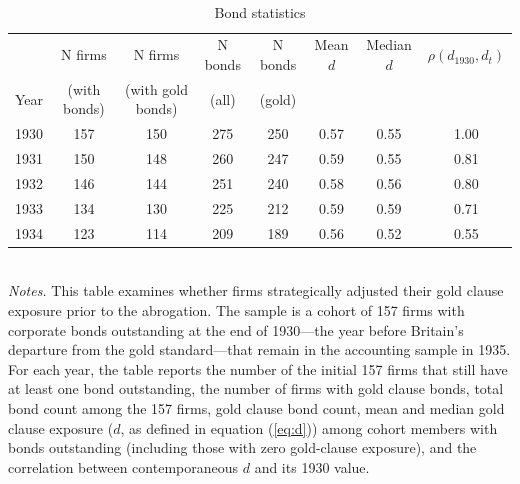 \begin{table}[p]
    \centering
    \caption{\\ Bond statistics}
    \scriptsize
    \label{tab:bond_stats}
    
    \begin{threeparttable}
        \begin{tabular}{lccccccc}
            \toprule
                 & N firms & N firms & N bonds & N bonds & Mean $d$ & Median $d$ & $\rho(d_{1930}, d_t)$ \\
            Year & (with bonds) & (with gold bonds) & (all) & (gold) & & & \\
            \midrule
            1930 & 157 & 150 & 275 & 250 & 0.57 & 0.55 & 1.00 \\
            1931 & 150 & 148 & 260 & 247 & 0.59 & 0.55 & 0.81 \\
            1932 & 146 & 144 & 251 & 240 & 0.58 & 0.56 & 0.80 \\
            1933 & 134 & 130 & 225 & 212 & 0.59 & 0.59 & 0.71 \\
            1934 & 123 & 114 & 209 & 189 & 0.56 & 0.52 & 0.55 \\
            \bottomrule
        \end{tabular}
    \end{threeparttable}\\
    
    \vspace*{3mm} \justifying \noindent
    \scriptsize{\textit{Notes.} This table examines whether firms strategically adjusted their gold clause exposure prior to the abrogation. The sample is a cohort of 157 firms with corporate bonds outstanding at the end of 1930---the year before Britain's departure from the gold standard---that remain in the accounting sample in 1935. For each year, the table reports the number of the initial 157 firms that still have at least one bond outstanding, the number of firms with gold clause bonds, total bond count among the 157 firms, gold clause bond count, mean and median gold clause exposure ($d$, as defined in equation (\ref{eq:d})) among cohort members with bonds outstanding (including those with zero gold-clause exposure), and the correlation between contemporaneous $d$ and its 1930 value.}
\end{table}